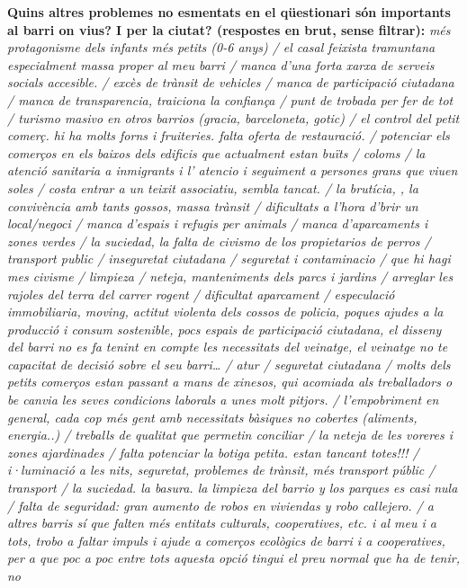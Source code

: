 \documentclass[]{article}
\begin{document}
\textbf{Quins altres problemes no esmentats en el qüestionari són
importants al barri on vius? I per la ciutat? (respostes en brut, sense
filtrar):} \emph{més protagonisme dels infants més petits (0-6 anys) /
el casal feixista tramuntana especialment massa proper al meu barri /
manca d'una forta xarxa de serveis socials accesible. / excès de trànsit
de vehicles / manca de participació ciutadana / manca de transparencia,
traiciona la confiança / punt de trobada per fer de tot / turismo masivo
en otros barrios (gracia, barceloneta, gotic) / el control del petit
comerç. hi ha molts forns i fruiteries. falta oferta de restauració. /
potenciar els comerços en els baixos dels edificis que actualment estan
buïts / coloms / la atenció sanitaria a inmigrants i l' atencio i
seguiment a persones grans que viuen soles / costa entrar a un teixit
associatiu, sembla tancat. / la brutícia, , la convivència amb tants
gossos, massa trànsit / dificultats a l'hora d'brir un local/negoci /
manca d'espais i refugis per animals / manca d'aparcaments i zones
verdes / la suciedad, la falta de civismo de los propietarios de perros
/ transport public / inseguretat ciutadana / seguretat i contaminacio /
que hi hagi mes civisme / limpieza / neteja, manteniments dels parcs i
jardins / arreglar les rajoles del terra del carrer rogent / dificultat
aparcament / especulació immobiliaria, moving, actitut violenta dels
cossos de policia, poques ajudes a la producció i consum sostenible,
pocs espais de participació ciutadana, el disseny del barri no es fa
tenint en compte les necessitats del veinatge, el veinatge no te
capacitat de decisió sobre el seu barri\ldots{} / atur / seguretat
ciutadana / molts dels petits comerços estan passant a mans de xinesos,
qui acomiada als treballadors o be canvia les seves condicions laborals
a unes molt pitjors. / l'empobriment en general, cada cop més gent amb
necessitats bàsiques no cobertes (aliments, energia..) / treballs de
qualitat que permetin conciliar / la neteja de les voreres i zones
ajardinades / falta potenciar la botiga petita. estan tancant totes!!! /
i·luminació a les nits, seguretat, problemes de trànsit, més transport
públic / transport / la suciedad. la basura. la limpieza del barrio y
los parques es casi nula / falta de seguridad: gran aumento de robos en
viviendas y robo callejero. / a altres barris sí que falten més entitats
culturals, cooperatives, etc. i al meu i a tots, trobo a faltar impuls i
ajude a comerços ecològics de barri i a cooperatives, per a que poc a
poc entre tots aquesta opció tingui el preu normal que ha de tenir, no
}
\end{document}
